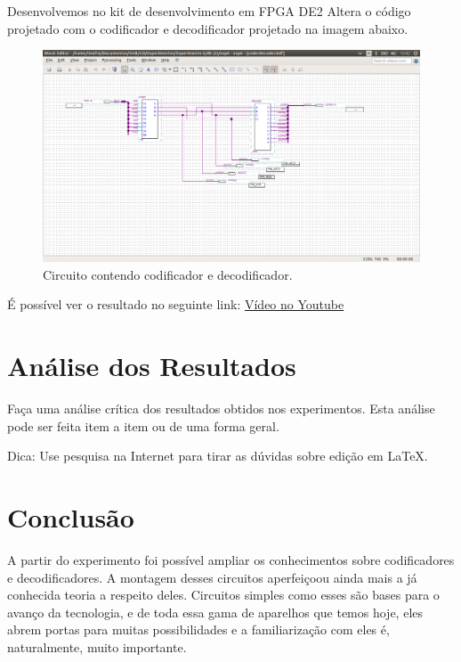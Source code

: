 \documentclass[12pt]{article}
\begin{document}
Desenvolvemos no kit de desenvolvimento em FPGA DE2 Altera o código projetado com o codificador e decodificador projetado na imagem abaixo. 

\begin{figure}[H]
	\centering
	\includegraphics[width=1\textwidth]{coderdecoder.png}
	\caption{Circuito contendo codificador e decodificador.}
	\label{fig:coderdecoder}
\end{figure}

É possível ver o resultado no seguinte link: \href{https://www.youtube.com/watch?v=paRaiHqDqBo}{Vídeo no Youtube}


\section{Análise dos Resultados}
\label{sec:Resultados}

Faça uma análise crítica dos resultados obtidos nos experimentos. Esta análise pode ser feita item a item ou de uma forma geral.

Dica: Use pesquisa na Internet para tirar as dúvidas sobre edição em \LaTeX .

\section{Conclusão}
\label{sec:Conclusao}

A partir do experimento foi possível ampliar os conhecimentos sobre codificadores e decodificadores. A montagem desses circuitos aperfeiçoou ainda mais a já conhecida teoria a respeito deles. Circuitos simples como esses são bases para o avanço da tecnologia, e de toda essa gama de aparelhos que temos hoje, eles abrem portas para muitas possibilidades e a familiarização com eles é, naturalmente, muito importante.
\end{document}
